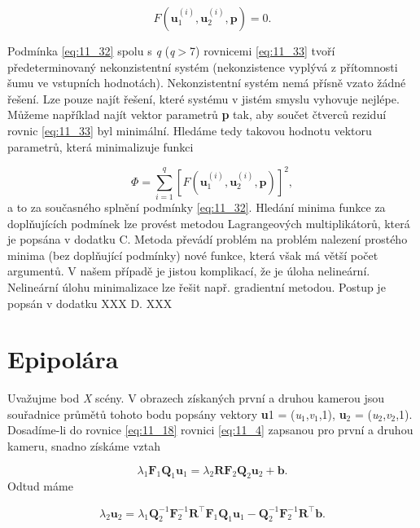 \begin{equation} \label{eq:11_33}
    F \left( \mathbf{u}_1^{(i)}, \mathbf{u}_2^{(i)}, \mathbf{p} \right) = 0.
\end{equation}

Podmínka \eqref{eq:11_32} spolu s \textit{q} (\textit{q}$>$7) rovnicemi \eqref{eq:11_33} tvoří předeterminovaný nekonzistentní systém (nekonzistence vyplývá z přítomnosti šumu ve vstupních hodnotách). Nekonzistentní systém nemá přísně vzato žádné řešení. Lze pouze najít řešení, které systému v jistém smyslu vyhovuje nejlépe. Můžeme například najít vektor parametrů \textbf{p} tak, aby součet čtverců reziduí rovnic \eqref{eq:11_33} byl minimální. Hledáme tedy takovou hodnotu vektoru parametrů, která minimalizuje funkci

\begin{equation} \label{eq:11_34}
    \Phi = \sum_{i=1}^{q} \left[ F\left( \mathbf{u}_1^{(i)}, \mathbf{u}_2^{(i)}, \mathbf{p} \right) \right]^2,
\end{equation}
a to za současného splnění podmínky \eqref{eq:11_32}. Hledání minima funkce za doplňujících podmínek lze provést metodou Lagrangeových multiplikátorů, která je popsána v dodatku C. Metoda převádí problém na problém nalezení prostého minima (bez doplňující podmínky) nové funkce, která však má větší počet argumentů. V našem případě je jistou komplikací, že je úloha nelineární. Nelineární úlohu minimalizace lze řešit např. gradientní metodou. Postup je popsán v dodatku XXX D. XXX

\section*{Epipolára}

Uvažujme bod \textit{X} scény. V obrazech získaných první a druhou kamerou jsou souřadnice průmětů tohoto bodu popsány vektory \textbf{u}1 = (\textit{u}$_1$,\textit{v}$_1$,1), \textbf{u}$_2$ = (\textit{u}$_2$,\textit{v}$_2$,1). Dosadíme-li do rovnice \eqref{eq:11_18} rovnici \eqref{eq:11_4} zapsanou pro první a druhou kameru, snadno získáme vztah

\begin{equation} \label{eq:11_35}
    \lambda_{1} \mathbf{F}_{1} \mathbf{Q}_{1} \mathbf{u}_{1} = \lambda_{2} \mathbf{RF}_{2} \mathbf{Q}_2 \mathbf{u}_{2} + \mathbf{b}.
\end{equation}
Odtud máme

\begin{equation} \label{eq:11_36}
    \lambda_2 \mathbf{u}_2 = \lambda_1 \mathbf{Q}_2^{-1} \mathbf{F}_2^{-1} \mathbf{R}^\top \mathbf{F}_1 \mathbf{Q}_{1} \mathbf{u}_1 - \mathbf{Q}_2^{-1} \mathbf{F}_2^{-1} \mathbf{R}^\top \mathbf{b}.
\end{equation}

